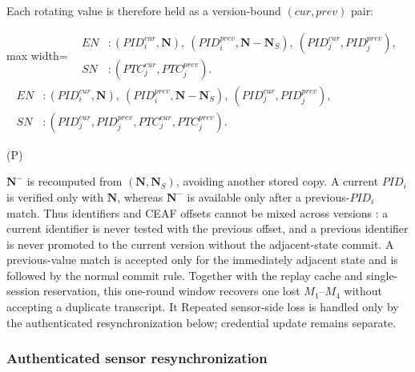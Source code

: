 \documentclass[cmc,article,submit,moreauthors,pdftex]{Definitions/tsp}
\newcounter{protoeq} %
\newenvironment{ceq}{%
  \refstepcounter{protoeq}%
  \par\vspace{-3pt}\setlength{\topsep}{0pt}\setlength{\partopsep}{0pt}\begin{center}%
}{%
  \hspace{0.45em}\textup{(P\theprotoeq)}%
  \end{center}\vspace{-3pt}%
} %
\providecommand{\DIFadd}[1]{{\protect\color{blue} \sf #1}} %
\providecommand{\DIFdel}[1]{{\protect\color{red} \scriptsize #1}} %
\providecommand{\DIFaddbegin}{} %
\providecommand{\DIFaddend}{} %
\providecommand{\DIFdelbegin}{} %
\providecommand{\DIFdelend}{} %
\begin{document}
Each rotating value is therefore held as a version-bound $(cur,prev)$ pair:

\DIFdelbegin %
\DIFdelend \DIFaddbegin \begin{ceq}
\DIFaddend \begin{adjustbox}{max width=\columnwidth}
\DIFdelbegin \DIFdel{%
\mbox{%
$\displaystyle\begin{aligned}
EN&: (PID_i^{cur},\mathbf{N}),\ (PID_i^{prev},\mathbf{N}-\mathbf{N}_S),\ (PID_j^{cur},PID_j^{prev}),\\
SN&: (PTC_j^{cur},PTC_j^{prev}).
\end{aligned}$
}%
}\DIFdelend \DIFaddbegin \DIFadd{%
\mbox{%
$\displaystyle\begin{aligned}
EN&: (PID_i^{cur},\mathbf{N}),\ (PID_i^{prev},\mathbf{N}-\mathbf{N}_S),\ (PID_j^{cur},PID_j^{prev}),\\
SN&: (PID_j^{cur},PID_j^{prev},PTC_j^{cur},PTC_j^{prev}).
\end{aligned}$
}%
}\DIFaddend \end{adjustbox}
\DIFdelbegin %
\DIFdelend \DIFaddbegin \end{ceq}
\DIFaddend 

$\mathbf{N}^{-}$ is recomputed from $(\mathbf{N},\mathbf{N}_S)$, avoiding another stored copy. A current $PID_i$ is verified only with $\mathbf{N}$, whereas $\mathbf{N}^{-}$ is available only after a previous-$PID_i$ match. Thus identifiers and CEAF offsets cannot be mixed across versions\DIFaddbegin \DIFadd{: a current identifier is never tested with the previous offset, and a previous identifier is never promoted to the current version without the adjacent-state commit}\DIFaddend . A previous-value match is accepted only for the immediately adjacent state and is followed by the normal commit rule. Together with the replay cache and single-session reservation, this one-round window recovers one lost $M_1$--$M_4$ without accepting a duplicate transcript. \DIFdelbegin \DIFdel{It }\DIFdelend \DIFaddbegin \DIFadd{Repeated sensor-side loss is handled only by the authenticated resynchronization below; credential update remains separate.
}

\subsubsection{Authenticated sensor resynchronization}\label{sec:resync}
\begingroup\small
\end{document}
